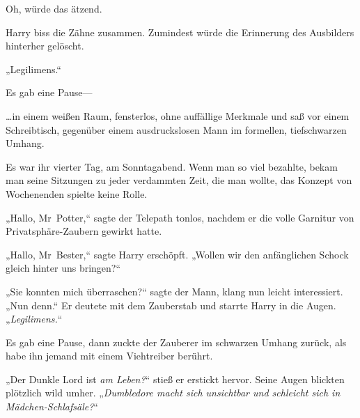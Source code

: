 Oh, würde das ätzend.

Harry biss die Zähne zusammen. Zumindest würde die Erinnerung des Ausbilders hinterher gelöscht.

„Legilimens.“

Es gab eine Pause—

\later

…in einem weißen Raum, fensterlos, ohne auffällige Merkmale und saß vor einem Schreibtisch, gegenüber einem ausdruckslosen Mann im formellen, tiefschwarzen Umhang.

Es war ihr vierter Tag, am Sonntagabend. Wenn man so viel bezahlte, bekam man seine Sitzungen zu jeder verdammten Zeit, die man wollte, das Konzept von Wochenenden spielte keine Rolle.

„Hallo, Mr~Potter,“ sagte der Telepath tonlos, nachdem er die volle Garnitur von Privatsphäre-Zaubern gewirkt hatte.

„Hallo, Mr~Bester,“ sagte Harry erschöpft. „Wollen wir den anfänglichen Schock gleich hinter uns bringen?“

„Sie konnten mich überraschen?“ sagte der Mann, klang nun leicht interessiert. „Nun denn.“ Er deutete mit dem Zauberstab und starrte Harry in die Augen. „\emph{Legilimens.}“

Es gab eine Pause, dann zuckte der Zauberer im schwarzen Umhang zurück, als habe ihn jemand mit einem Viehtreiber berührt.

„Der Dunkle Lord ist \emph{am Leben?}“ stieß er erstickt hervor. Seine Augen blickten plötzlich wild umher. „\emph{Dumbledore macht sich unsichtbar und schleicht sich in Mädchen-Schlafsäle?}“

